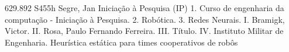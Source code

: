 \documentclass[
	12pt,				%
	oneside,			%
	a4paper,			%
	english,			%
	brazil,				%
	]{ime-abntex2}
\begin{document}


\imprimircapa
%

\imprimirfolhaderosto*
%


%
%     
\imprimirfichacatalografica
{629.892}
{S455h}
{Segre, Jan}
{Iniciação à Pesquisa (IP)}
{1. Curso de engenharia da computação - Iniciação à Pesquisa.
 2. Robótica.
 3. Redes Neurais.
 I. Bramigk, Victor.
 II. Rosa, Paulo Fernando Ferreira.
 III. Título.
 IV. Instituto Militar de Engenharia.}
{Heurística estática para times cooperativos de robôs}

%
%
%
%
\end{document}
